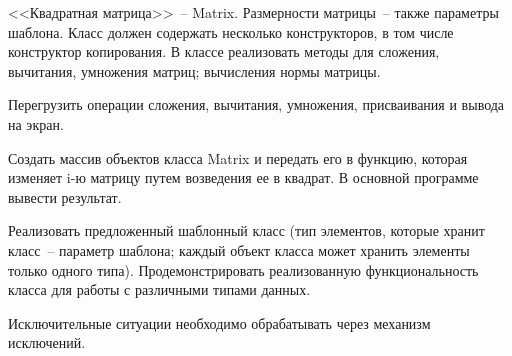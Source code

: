 
<<Квадратная матрица>>~-- Matrix. Размерности матрицы~-- также параметры шаблона.
Класс должен содержать несколько конструкторов, в том числе конструктор копирования.
В классе реализовать методы для сложения, вычитания, умножения матриц; вычисления
нормы матрицы.

Перегрузить операции сложения, вычитания, умножения, присваивания и
вывода на экран.

Создать массив объектов класса Matrix и передать его в функцию,
которая изменяет i-ю матрицу путем возведения ее в квадрат. В основной программе
вывести результат.

Реализовать предложенный шаблонный класс (тип элементов, которые
хранит класс~-- параметр шаблона; каждый объект класса может хранить
элементы только одного типа). Продемонстрировать реализованную
функциональность класса для работы с различными типами данных.

Исключительные ситуации необходимо обрабатывать через механизм исключений.
